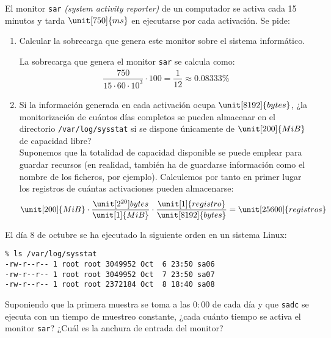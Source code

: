 \begin{ejercicio}
    El monitor \verb|sar| \emph{(system activity reporter)} de un computador se activa cada 15 minutos y tarda $\unit[750]{ms}$ en ejecutarse por cada activación. Se pide:
    \begin{enumerate}
        \item Calcular la sobrecarga que genera este monitor sobre el sistema informático.
        
        La sobrecarga que genera el monitor \verb|sar| se calcula como:
        \begin{align*}
            \dfrac{750}{15\cdot 60\cdot 10^3} \cdot 100 = \dfrac{1}{12}\approx 0.08333\%
        \end{align*}
        \item Si la información generada en cada activación ocupa $\unit[8192]{bytes}$, ¿la monitorización de cuántos días completos se pueden almacenar en el directorio \verb|/var/log/sysstat| si se dispone únicamente de $\unit[200]{MiB}$ de capacidad libre?\\

        Suponemos que la totalidad de capacidad disponible se puede emplear para guardar recursos (en realidad, también ha de guardarse información como el nombre de los ficheros, por ejemplo). Calculemos por tanto en primer lugar los registros de cuántas activaciones pueden almacenarse:
        \begin{equation*}
            \unit[200]{MiB}\cdot \dfrac{\unit[2^{20}]{bytes}}{\unit[1]{MiB}} \cdot \dfrac{\unit[1]{registro}}{\unit[8192]{bytes}} = \unit[25600]{registros}
        \end{equation*}

        
    \end{enumerate}
\end{ejercicio}
\begin{comment}
    Solución: La sobrecarga es del 0,083 \% y se pueden almacenar la información de 266 días completos.
\end{comment}

\begin{ejercicio}
    El día 8 de octubre se ha ejecutado la siguiente orden en un sistema Linux:
    \begin{verbatim}
% ls /var/log/sysstat
-rw-r--r-- 1 root root 3049952 Oct  6 23:50 sa06
-rw-r--r-- 1 root root 3049952 Oct  7 23:50 sa07
-rw-r--r-- 1 root root 2372184 Oct  8 18:40 sa08
    \end{verbatim}

    Suponiendo que la primera muestra se toma a las $0:00$ de cada día y que \verb|sadc| se ejecuta con un tiempo de muestreo constante, ¿cada cuánto tiempo se activa el monitor \verb|sar|? ¿Cuál es la anchura de entrada del monitor?
\end{ejercicio}

